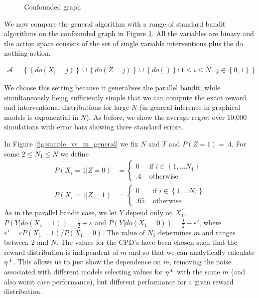 \documentclass[11pt,a4paper,oneside]{book}
\newcommand{\calA}{\mathcal A}
\newcommand{\set}[1]{\left\{#1\right\}}
\newcommand{\eq}[1]{\begin{align*}#1\end{align*}}
\theoremstyle{plain}
\theoremstyle{definition}
\let\epsilon\varepsilon
\begin{document}
\begin{figure}[H]
	\centering    
        \caption{Confounded graph}
        \label{fig:parallel_confounded} 
\end{figure}


We now compare the general algorithm with a range of standard bandit algorithms on the confounded graph in Figure \ref{fig:parallel_confounded}. All the variables are binary and the action space consists of the set of single variable interventions plus the do nothing action, 

\eq{
\calA = \set{\set{do(X_i = j)} \cup \set{do(Z = j)} \cup \set{do()}: 1\leq i \leq N,\; j \in \set{0,1}}
} 

We choose this setting because it generalises the parallel bandit, while simultaneously being sufficiently simple that we can compute the exact reward and interventional distributions for large $N$ (in general inference in graphical models is exponential in $N$). As before, we show the average regret over 10,000 simulations with error bars showing three standard errors. 

In Figure \ref{fig:simple_vs_m_general} we fix $N$ and $T$ and $P(Z=1) = .4$. For some $2 \leq N_1 \leq N$ we define 
\eq{
P(X_i = 1|Z = 0) &= \begin{cases} 0 & \text{ if } i \in \set{1,...N_1} \\ .4 & \text{ otherwise } \end{cases}\\
P(X_i = 1|Z = 1) &= \begin{cases} 0 & \text{ if } i \in \set{1,...N_1} \\ .65 & \text{ otherwise } \end{cases}
}
As in the parallel bandit case, we let $Y$ depend only on $X_1$, $P(Y|do(X_1=1)) = \frac{1}{2} + \epsilon$ and $P(Y|do(X_1=0)) = \frac{1}{2}-\epsilon'$, where $\epsilon' = \epsilon P(X_1=1) / P(X_1=0)$. The value of $N_1$ determines $m$ and ranges between $2$ and $N$. The values for the CPD's have been chosen such that the reward distribution is independent of $m$ and so that we can analytically calculate $\eta*$. This allows us to just show the dependence on $m$, removing the noise associated with different models selecting values for $\eta*$ with the same $m$ (and also worst case performance), but different performance for a given reward distribution. 
\end{document}

